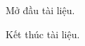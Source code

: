 \documentclass[12pt]{article}
\begin{document}
Mở đầu tài liệu.


Kết thúc tài liệu.
\end{document}
